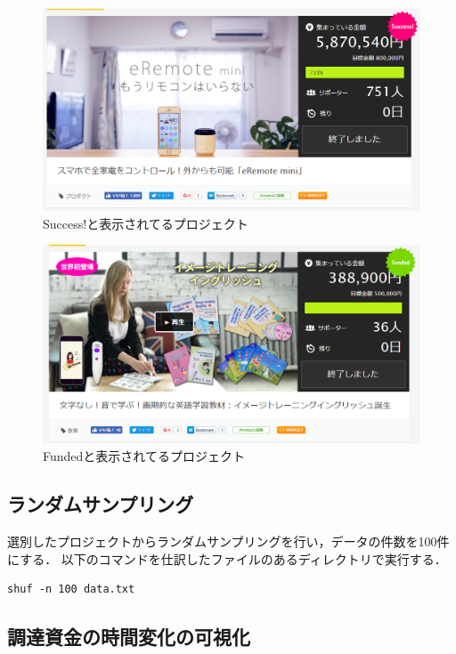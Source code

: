 \begin{figure}[H]
\centering
\includegraphics[width=16cm]{senbetu2.PNG}
\caption{Success!と表示されてるプロジェクト}\label{サンプル図}
\end{figure}

\newpage

\begin{figure}[H]
\centering
\includegraphics[width=16cm]{senbetu1.PNG}
\caption{Fundedと表示されてるプロジェクト}\label{サンプル図}
\end{figure}



\subsection{ランダムサンプリング}
選別したプロジェクトからランダムサンプリングを行い，データの件数を100件にする．
以下のコマンドを仕訳したファイルのあるディレクトリで実行する．

\begin{verbatim}
shuf -n 100 data.txt
\end{verbatim}

\newpage
\subsection{調達資金の時間変化の可視化}

